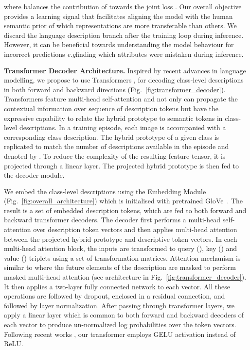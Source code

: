 \documentclass{bmvc2k}
\def\eg{\emph{e.g}\bmvaOneDot}
\begin{document}
\noindent where  balances the contribution of  towards the joint loss . Our overall objective provides a learning signal that facilitates aligning the model with the human semantic prior of which representations are more transferable than others. We discard the language description branch after the training loop during inference. However, it can be beneficial towards understanding the model behaviour for incorrect predictions \eg finding which attributes were mistaken during inference.

\noindent \textbf{Transformer Decoder Architecture.} Inspired by recent advances in language modelling, we propose to use Transformers \cite{transformer}, for decoding class-level descriptions in both forward and backward directions (Fig.~\ref{fig:transformer_decoder}). Transformers feature multi-head self-attention and not only can propagate the contextual information over sequence of description tokens but have the expressive capability to relate the hybrid prototype to semantic tokens in class-level descriptions. In a training episode, each image is accompanied with a corresponding class description. The hybrid prototype  of a given class is replicated to match the number of descriptions available in the episode and denoted by . To reduce the complexity of the resulting feature tensor, it is projected through a linear layer. The projected hybrid prototype  is then fed to the decoder module. 



We embed the class-level descriptions using the Embedding Module (Fig.~\ref{fig:overall_architecture}) which is initialised with pretrained GloVe~\cite{pennington2014glove}. The result is a set of embedded description tokens, which are fed to both forward and backward transformer decoders. The decoder first performs a multi-head self-attention over description token vectors and then applies multi-head attention between the projected hybrid prototype and descriptive token vectors. In each multi-head attention block, the inputs are transformed to query (), key () and value () triplets using a set of transformation matrices.  Attention mechanism is similar to \cite{transformer} where the future elements of the description are masked to perform masked multi-head attention (see architecture in Fig.~\ref{fig:transformer_decoder}). It then applies a two-layer fully connected network to each vector. All these operations are followed by dropout, enclosed in a residual connection, and followed by layer normalization. After passing through transformer layers, we apply a linear layer which is common to both forward and backward decoders of each vector to produce un-normalized log probabilities over the token vectors. Following recent works \cite{desai2020virtex}, our transformer employs GELU activation \cite{DBLP:journals/corr/HendrycksG16} instead of ReLU. 
\end{document}

